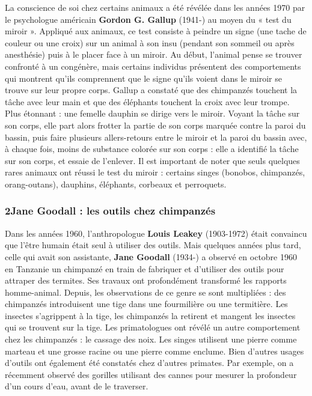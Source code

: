 La conscience de soi chez certains animaux a été révélée dans les années 1970 par le psychologue américain \textbf{Gordon G. Gallup} (1941-) au moyen du « test du miroir ». Appliqué aux animaux, ce test consiste à peindre un signe (une tache de couleur ou une croix) sur un animal à son insu (pendant son sommeil ou après anesthésie) puis à le placer face à un miroir. Au début, l’animal pense se trouver confronté à un congénère, mais certains individus présentent des comportements qui montrent qu’ils comprennent que le signe qu’ils voient dans le miroir se trouve sur leur propre corps. Gallup a constaté que des chimpanzés touchent la tâche avec leur main et que des éléphants touchent la croix avec leur trompe. Plus étonnant : une femelle dauphin se dirige vers le miroir. Voyant la tâche sur son corps, elle part alors frotter la partie de son corps marquée contre la paroi du bassin, puis faire plusieurs allers-retours entre le miroir et la paroi du bassin avec, à chaque fois, moins de substance colorée sur son corps : elle a identifié la tâche sur son corps, et essaie de l’enlever. Il est important de noter que seuls quelques rares animaux ont réussi le test du miroir : certains singes (bonobos, chimpanzés, orang-outans), dauphins, éléphants, corbeaux et perroquets.
\subsubsection*{2\quad Jane Goodall : les outils chez chimpanzés}
Dans les années 1960, l’anthropologue \textbf{Louis Leakey} (1903-1972) était convaincu que l’être humain était seul à utiliser des outils. Mais quelques années plus tard, celle qui avait son assistante, \textbf{Jane Goodall} (1934-) a observé en octobre 1960 en Tanzanie un chimpanzé en train de fabriquer et d’utiliser des outils pour attraper des termites. Ses travaux ont profondément transformé les rapports homme-animal. Depuis, les observations de ce genre se sont multipliées : des chimpanzés introduisent une tige dans une fourmilière ou une termitière. Les insectes s’agrippent à la tige, les chimpanzés la retirent et mangent les insectes qui se trouvent sur la tige. Les primatologues ont révélé un autre comportement chez les chimpanzés : le cassage des noix. Les singes utilisent une pierre comme marteau et une grosse racine ou une pierre comme enclume. Bien d’autres usages d’outils ont également été constatés chez d’autres primates. Par exemple, on a récemment observé des gorilles utilisant des cannes pour mesurer la profondeur d’un cours d’eau, avant de le traverser.

